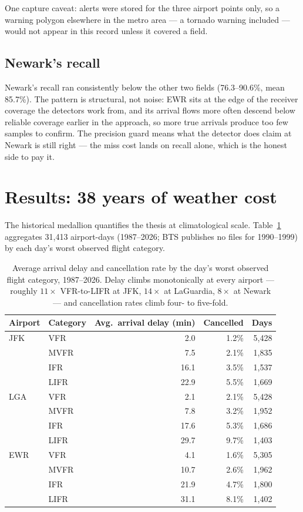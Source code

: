 \documentclass[11pt]{article}
\begin{document}
One capture caveat: alerts were stored for the three airport points only,
so a warning polygon elsewhere in the metro area --- a tornado warning
included --- would not appear in this record unless it covered a field.

\subsection{Newark's recall}

Newark's recall ran consistently below the other two fields
(76.3--90.6\%, mean 85.7\%). The pattern is structural, not noise: EWR sits at the
edge of the receiver coverage the detectors work from, and its
arrival flows more often descend below reliable coverage earlier in the
approach, so more true arrivals produce too few samples to confirm. The
precision guard means what the detector does claim at Newark is still right
--- the miss cost lands on recall alone, which is the honest side to pay it.

\section{Results: 38 years of weather cost}

The historical medallion quantifies the thesis at climatological scale.
Table~\ref{tab:thesis} aggregates 31{,}413 airport-days (1987--2026; BTS
publishes no files for 1990--1999) by each day's worst observed flight
category.

\begin{table}[H]
\centering
\small
\begin{tabular}{llrrr}
\toprule
Airport & Category & Avg.\ arrival delay (min) & Cancelled & Days \\
\midrule
JFK & VFR  &  2.0 & 1.2\% & 5{,}428 \\
    & MVFR &  7.5 & 2.1\% & 1{,}835 \\
    & IFR  & 16.1 & 3.5\% & 1{,}537 \\
    & LIFR & 22.9 & 5.5\% & 1{,}669 \\
\midrule
LGA & VFR  &  2.1 & 2.1\% & 5{,}428 \\
    & MVFR &  7.8 & 3.2\% & 1{,}952 \\
    & IFR  & 17.6 & 5.3\% & 1{,}686 \\
    & LIFR & 29.7 & 9.7\% & 1{,}403 \\
\midrule
EWR & VFR  &  4.1 & 1.6\% & 5{,}305 \\
    & MVFR & 10.7 & 2.6\% & 1{,}962 \\
    & IFR  & 21.9 & 4.7\% & 1{,}800 \\
    & LIFR & 31.1 & 8.1\% & 1{,}402 \\
\bottomrule
\end{tabular}
\caption{Average arrival delay and cancellation rate by the day's worst
observed flight category, 1987--2026. Delay climbs monotonically at every
airport --- roughly $11\times$ VFR-to-LIFR at JFK, $14\times$ at LaGuardia,
$8\times$ at Newark --- and cancellation rates climb four- to five-fold.}
\label{tab:thesis}
\end{table}
\end{document}
